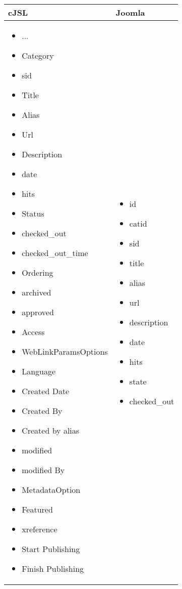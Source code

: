 \begin{minipage}{0.7\textwidth}
\begin{tabular}{|p{} | p{}|}
\hline
\textbf{cJSL} & \textbf{Joomla} \\ 
\hline
\begin{itemize}
\item ...
\item   Category
\item   sid
\item   Title
\item   Alias
\item   Url
\item   Description
\item   date
\item   hits
\item   Status
\item   checked\_out
\item   checked\_out\_time
\item   Ordering
\item   archived
\item   approved
\item   Access
\item   WebLinkParamsOptions
\item   Language
\item   Created Date
\item   Created By
\item   Created by alias
\item   modified
\item   modified By
\item   MetadataOption
\item   Featured
\item   xreference
\item   Start Publishing
\item   Finish Publishing
\end{itemize}
 & 
\begin{itemize}
\item id
\item   catid
\item   sid
\item   title
\item   alias
\item   url
\item   description
\item   date
\item   hits
\item   state
\item   checked\_out

\end{itemize}
\end{tabular}
\end{minipage}
